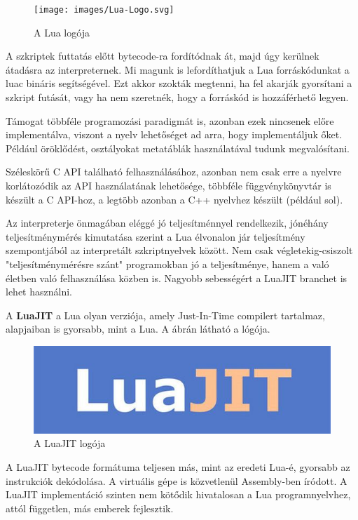 \begin{figure}[h]
\centering
\texttt{[image: images/Lua-Logo.svg]}
\caption{A Lua logója \cite{lua_logo}}
\label{fig:lua_logo}
\end{figure}

A szkriptek futtatás előtt bytecode-ra fordítódnak át, majd úgy kerülnek átadásra az interpreternek. Mi magunk is lefordíthatjuk a Lua forráskódunkat a luac bináris segítségével.
Ezt akkor szokták megtenni, ha fel akarják gyorsítani a szkript futását, vagy ha nem szeretnék, hogy a forráskód is hozzáférhető legyen.

Támogat többféle programozási paradigmát is, azonban ezek nincsenek előre implementálva, viszont a nyelv lehetőséget ad arra, hogy implementáljuk őket. Például öröklődést, osztályokat metatáblák használatával tudunk megvalósítani. \cite{ooplua}

Széleskörű C API található felhasználásához, azonban nem csak erre a nyelvre korlátozódik az API használatának lehetősége, többféle függvénykönyvtár is készült a C API-hoz, a legtöbb azonban a C++ nyelvhez készült (például sol). \cite{sol_vs_other_bindings} 

Az interpreterje önmagában eléggé jó teljesítménnyel rendelkezik, jónéhány teljesítménymérés kimutatása szerint a Lua élvonalon jár teljesítmény szempontjából az interpretált szkriptnyelvek között. Nem csak végletekig-csiszolt "teljesítménymérésre szánt" programokban jó a teljesítménye, hanem a való életben való felhasználása közben is. Nagyobb sebességért a LuaJIT branchet is lehet használni.

A \textbf{LuaJIT} a Lua olyan verziója, amely Just-In-Time compilert tartalmaz, alapjaiban is gyorsabb, mint a Lua. A  ábrán látható a lógója.

\begin{figure}[h]
\centering
\includegraphics[scale=0.15]{images/luajit-logo.jpg}
\caption{A LuaJIT logója \cite{luajit_logo}}
\label{fig:luajit_logo}
\end{figure}

A LuaJIT bytecode formátuma teljesen más, mint az eredeti Lua-é, gyorsabb az instrukciók dekódolása. A virtuális gépe is közvetlenül Assembly-ben íródott. A LuaJIT implementáció szinten nem kötődik hivatalosan a Lua programnyelvhez, attól független, más emberek fejlesztik. \cite {luajit}

